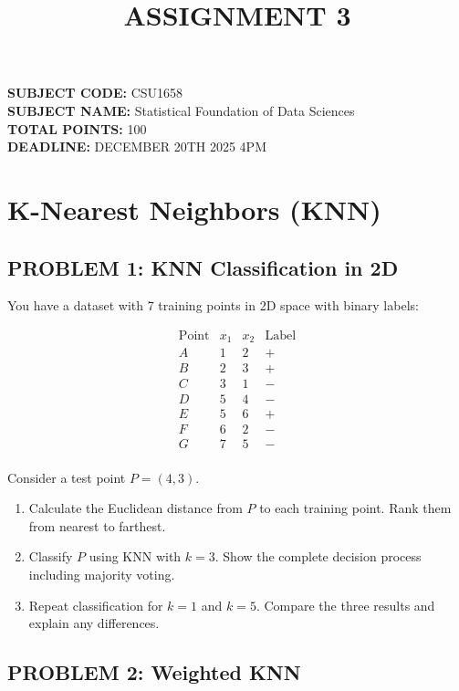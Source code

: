 \documentclass[12pt]{article}
\title{ASSIGNMENT 3}
\author{}
\date{}
\begin{document}
\maketitle

\noindent
\textbf{SUBJECT CODE:} CSU1658 \\
\textbf{SUBJECT NAME:} Statistical Foundation of Data Sciences \\
\textbf{TOTAL POINTS:} 100 \\
\textbf{DEADLINE:} DECEMBER 20TH 2025 4PM

\section*{K-Nearest Neighbors (KNN)}

\subsection*{PROBLEM 1: KNN Classification in 2D}

You have a dataset with 7 training points in 2D space with binary labels:

\[\begin{array}{c|cc|c}
\text{Point} & x_1 & x_2 & \text{Label} \\
\hline
A & 1 & 2 & + \\
B & 2 & 3 & + \\
C & 3 & 1 & - \\
D & 5 & 4 & - \\
E & 5 & 6 & + \\
F & 6 & 2 & - \\
G & 7 & 5 & - \\
\end{array}\]

Consider a test point \(P = (4, 3)\).

\begin{enumerate}
\item[(a)] Calculate the Euclidean distance from \(P\) to each training point. Rank them from nearest to farthest.
\item[(b)] Classify \(P\) using KNN with \(k = 3\). Show the complete decision process including majority voting.
\item[(c)] Repeat classification for \(k = 1\) and \(k = 5\). Compare the three results and explain any differences.
\end{enumerate}

\subsection*{PROBLEM 2: Weighted KNN}
\end{document}
